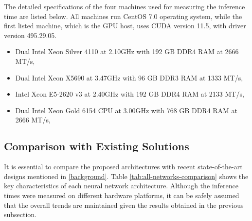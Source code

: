 The detailed specifications of the four machines used for measuring the inference time are listed below. All machines run CentOS 7.0 operating system, while the first listed machine, which is the GPU host, uses CUDA version 11.5, with driver version 495.29.05.

\begin{itemize}
  \item Dual Intel Xeon Silver 4110 at 2.10GHz with 192 GB DDR4 RAM at 2666 MT/s,
  \item Dual Intel Xeon X5690 at 3.47GHz with 96 GB DDR3 RAM at 1333 MT/s,
  \item Intel Xeon E5-2620 v3 at 2.40GHz with 192 GB DDR4 RAM at 2133 MT/s,
  \item Dual Intel Xeon Gold 6154 CPU at 3.00GHz with 768 GB DDR4 RAM at 2666 MT/s,
\end{itemize}

\subsection{Comparison with Existing Solutions}
It is essential to compare the proposed architectures with recent state-of-the-art designs mentioned in \cref{background}. Table \ref{tab:all-networks-comparison} shows the key characteristics of each neural network architecture. Although the inference times were measured on different hardware platforms, it can be safely assumed that the overall trends are maintained given the results obtained in the previous subsection.

